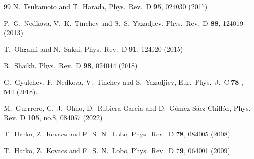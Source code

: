 \documentclass[a4paper,12pt]{article}
\begin{document}
\begin{thebibliography}{99}
  N.~Tsukamoto and T.~Harada,
  Phys.\ Rev.\ D {\bf 95},   024030 (2017)

  P.~G.~Nedkova, V.~K.~Tinchev and S.~S.~Yazadjiev,
  Phys.\ Rev.\ D {\bf 88},   124019 (2013)

  T.~Ohgami and N.~Sakai,
  Phys.\ Rev.\ D {\bf 91}, 124020 (2015)

  R.~Shaikh,
  Phys.\ Rev.\ D {\bf 98},  024044 (2018)

  G.~Gyulchev, P.~Nedkova, V.~Tinchev and S.~Yazadjiev,
  Eur.\ Phys.\ J.\ C {\bf 78} ,  544 (2018).

M.~Guerrero, G.~J.~Olmo, D.~Rubiera-Garcia and D.~G\'omez S\'aez-Chill\'on,
Phys. Rev. D \textbf{105}, no.8, 084057 (2022)

  T.~Harko, Z.~Kovacs and F.~S.~N.~Lobo,
  Phys.\ Rev.\ D {\bf 78}, 084005 (2008)

  T.~Harko, Z.~Kovacs and F.~S.~N.~Lobo,
  Phys.\ Rev.\ D {\bf 79}, 064001 (2009)


\end{thebibliography}
\end{document}
